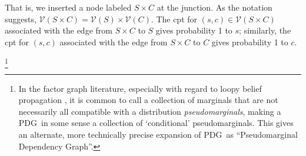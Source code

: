 \documentclass{article}
\newcommand{\vfullfootnote}[1]{}
\renewcommand{\vfullfootnote}[1]{\footnote{#1}}
\newcommand{\V}{\mathcal V}
\newcommand{\MN}{PDG}
\numberwithin{equation}{section}
\begin{document}
	\begin{center}
	\end{center}
That is, we inserted a node labeled $S \times C$ at the junction.  As
the notation suggests, $\V( S \times C) = \V(S) \times \V(C)$.
The cpt for $(s,c) \in \V(S \times C)$  associated with 
the edge from $S \times C$ to $S$ gives probability 1 to $s$;
similarly, the cpt for $(s,c)$  associated with 
the edge from $S \times C$ to $C$ gives probability 1 to $c$.

	
	\vfullfootnote{In the factor graph literature, especially with regard to loopy belief propagation \parencite{wainwright2008graphical}, it is common to call a collection of marginals that are not necessarily all compatible with a distribution \emph{pseudomarginals}, making a \MN\ in some sense a collection of `conditional' pseudomarginals. This gives an alternate, more technically precise expansion of \MN\ as ``Pseudomarginal Dependency Graph''.}
\end{document}
